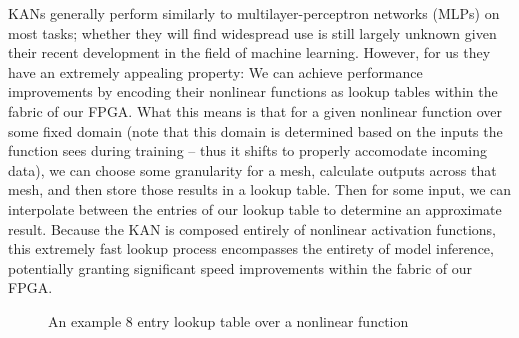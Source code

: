 \documentclass[psamsfonts]{amsart}
\theoremstyle{definition}
\theoremstyle{remark}
\numberwithin{equation}{section}
\begin{document}
KANs generally perform similarly to multilayer-perceptron networks (MLPs) on most tasks; whether they will find widespread use is still largely unknown given their recent development in the field of machine learning. However, for us they have an extremely appealing property: We can achieve performance improvements by encoding their nonlinear functions as lookup tables within the fabric of our FPGA. What this means is that for a given nonlinear function over some fixed domain (note that this domain is determined based on the inputs the function sees during training -- thus it shifts to properly accomodate incoming data), we can choose some granularity for a mesh, calculate outputs across that mesh, and then store those results in a lookup table. Then for some input, we can interpolate between the entries of our lookup table to determine an approximate result. Because the KAN is composed entirely of nonlinear activation functions, this extremely fast lookup process encompasses the entirety of model inference, potentially granting significant speed improvements within the fabric of our FPGA.

\begin{figure}[H]
  \caption{An example 8 entry lookup table over a nonlinear function}
  \label{fig:lkup-diagram}
\end{figure}
\end{document}
